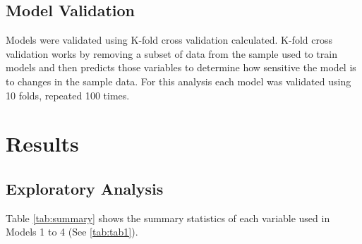 \documentclass[review,12pt,authoryear]{elsarticle}
\begin{document}
\begin{linenumbers}
\subsection{Model Validation}
Models were validated using K-fold cross validation calculated. K-fold cross validation works by removing a subset of data from the sample used to train models and then predicts those variables to determine how sensitive the model is to changes in the sample data. For this analysis each model was validated using 10 folds, repeated 100 times.
\par
\section{Results}
\subsection{Exploratory Analysis} \label{sec:exp_anal}
 Table \ref{tab:summary} shows the summary statistics of each variable used in Models 1 to 4 (See \ref{tab:tab1}).
\begin{table}[]
  \caption{Summary statistics of each continuous variable.}\label{tab:summary}
\end{table}
\end{linenumbers}
\end{document}
